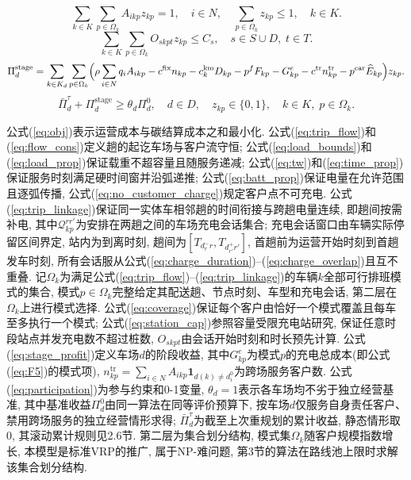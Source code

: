 \documentclass{setp-new}
\begin{document}
\begin{equation}
\sum_{k\in K}\sum_{p\in\Omega_k}A_{ikp}z_{kp}=1,\quad i\in N,\quad
\sum_{p\in\Omega_k}z_{kp}\le1,\quad k\in K.
\label{eq:coverage}
\end{equation}
\begin{equation}
\sum_{k\in K}\sum_{p\in\Omega_k}O_{skpt}z_{kp}\le C_s,\quad s\in S\cup D,\;t\in T.
\label{eq:station_cap}
\end{equation}
\begin{equation}
\Pi_d^{\mathrm{stage}}=\sum_{k\in K_d}\sum_{p\in\Omega_k}
\Bigl(\rho\sum_{i\in N}q_iA_{ikp}
-c^{\mathrm{fix}}n_{kp}-c_k^{\mathrm{km}}D_{kp}-p^fF_{kp}-G_{kp}^{e}
-c^{\mathrm{tr}}n_{kp}^{\mathrm{tr}}-p^{\mathrm{car}}\widehat E_{kp}\Bigr)z_{kp}.
\label{eq:stage_profit}
\end{equation}
\begin{equation}
\bar\Pi_d^\tau+\Pi_d^{\mathrm{stage}}\ge\theta_d\Pi_d^0,\quad d\in D,\quad
z_{kp}\in\{0,1\},\quad k\in K,\;p\in\Omega_k.
\label{eq:participation}
\end{equation}

公式(\ref{eq:obj})表示运营成本与碳结算成本之和最小化.
公式(\ref{eq:trip_flow})和(\ref{eq:flow_cons})定义趟的起讫车场与客户流守恒;
公式(\ref{eq:load_bounds})和(\ref{eq:load_prop})保证载重不超容量且随服务递减;
公式(\ref{eq:tw})和(\ref{eq:time_prop})保证服务时刻满足硬时间窗并沿弧递推;
公式(\ref{eq:batt_prop})保证电量在允许范围且逐弧传播, 公式(\ref{eq:no_customer_charge})规定客户点不可充电.
公式(\ref{eq:trip_linkage})保证同一实体车相邻趟的时间衔接与跨趟电量连续, 即趟间按需补电,
其中$\mathcal Q_{kp}^{rr'}$为安排在两趟之间的车场充电会话集合;
充电会话窗口由车辆实际停留区间界定, 站内为到离时刻, 趟间为$[T_{d_r^-r},T_{d_{r'}^+r'}]$,
首趟前为运营开始时刻到首趟发车时刻, 所有会话服从公式(\ref{eq:charge_duration})--(\ref{eq:charge_overlap})且互不重叠.
记$\Omega_k$为满足公式(\ref{eq:trip_flow})--(\ref{eq:trip_linkage})的车辆$k$全部可行排班模式的集合,
模式$p\in\Omega_k$完整给定其配送趟、节点时刻、车型和充电会话, 第二层在$\Omega_k$上进行模式选择.
公式(\ref{eq:coverage})保证每个客户由恰好一个模式覆盖且每车至多执行一个模式;
公式(\ref{eq:station_cap})参照容量受限充电站研究\cite{ref:12,ref:13},
保证任意时段站点并发充电数不超过桩数, $O_{skpt}$由会话开始时刻和时长预先计算.
公式(\ref{eq:stage_profit})定义车场$d$的阶段收益, 其中$G_{kp}^{e}$为模式$p$的充电总成本(即公式(\ref{eq:F5})的模式项),
$n_{kp}^{\mathrm{tr}}=\sum_{i\in N}A_{ikp}\mathbf 1_{d(k)\neq d_i^0}$为跨场服务客户数.
公式(\ref{eq:participation})为参与约束和0-1变量, $\theta_d=1$表示各车场均不劣于独立经营基准,
其中基准收益$\Pi_d^0$由同一算法在同等评价预算下, 按车场$d$仅服务自身责任客户、禁用跨场服务的独立经营情形求得;
$\bar\Pi_d^\tau$为截至上次重规划的累计收益, 静态情形取0, 其滚动累计规则见2.6节.
第二层为集合划分结构, 模式集$\Omega_k$随客户规模指数增长,
本模型是标准VRP的推广, 属于NP-难问题, 第3节的算法在路线池上限时求解该集合划分结构.
\end{document}
